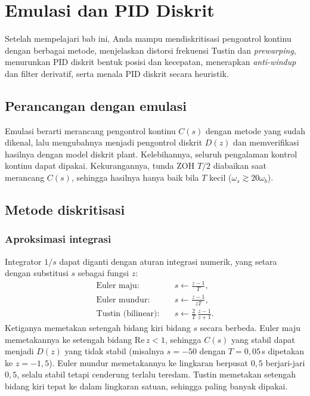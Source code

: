 \chapter{Emulasi dan PID Diskrit}
\label{bab:emulasi}

\begin{tujuan}
	Setelah mempelajari bab ini, Anda mampu mendiskritisasi pengontrol kontinu dengan berbagai metode, menjelaskan distorsi frekuensi Tustin dan \textit{prewarping}, menurunkan PID diskrit bentuk posisi dan kecepatan, menerapkan \textit{anti-windup} dan filter derivatif, serta menala PID diskrit secara heuristik.
\end{tujuan}

\section{Perancangan dengan emulasi}
Emulasi berarti merancang pengontrol kontinu $C(s)$ dengan metode yang sudah dikenal, lalu mengubahnya menjadi pengontrol diskrit $D(z)$ dan memverifikasi hasilnya dengan model diskrit plant. Kelebihannya, seluruh pengalaman kontrol kontinu dapat dipakai. Kekurangannya, tunda ZOH $T/2$ diabaikan saat merancang $C(s)$, sehingga hasilnya hanya baik bila $T$ kecil ($\omega_s \gtrsim 20\omega_b$).

\section{Metode diskritisasi}
\subsection{Aproksimasi integrasi}
Integrator $1/s$ dapat diganti dengan aturan integrasi numerik, yang setara dengan substitusi $s$ sebagai fungsi $z$:
\begin{align}
	\text{Euler maju:}\quad & s \leftarrow \frac{z-1}{T}, \\
	\text{Euler mundur:}\quad & s \leftarrow \frac{z-1}{zT}, \\
	\text{Tustin (bilinear):}\quad & s \leftarrow \frac{2}{T}\,\frac{z-1}{z+1}.
\end{align}
Ketiganya memetakan setengah bidang kiri bidang $s$ secara berbeda. Euler maju memetakannya ke setengah bidang $\text{Re}\,z < 1$, sehingga $C(s)$ yang stabil dapat menjadi $D(z)$ yang tidak stabil (misalnya $s = -50$ dengan $T = 0{,}05$\,s dipetakan ke $z = -1{,}5$). Euler mundur memetakannya ke lingkaran berpusat $0{,}5$ berjari-jari $0{,}5$, selalu stabil tetapi cenderung terlalu teredam. Tustin memetakan setengah bidang kiri tepat ke dalam lingkaran satuan, sehingga paling banyak dipakai.

